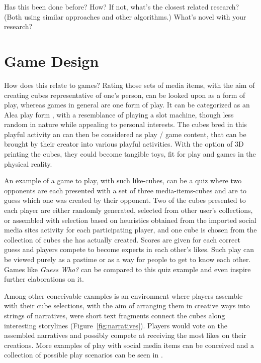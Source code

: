 \documentclass[]{article}
\begin{document}
\begin{framed}
Has this been done before? How? If not, what’s the closest related research? (Both using similar approaches and other algorithms.) What’s novel with your research?
\end{framed}

\section{Game Design}
\label{sec:GameDesign}

How does this relate to games?  Rating those sets of media items, with the aim of creating cubes representative of one's person, can be looked upon as a form of play, whereas games in general are one form of play.  It can be categorized as an Alea play form \cite{caillois2001man}, with a resemblance of playing a slot machine, though less random in nature while appealing to personal interests.  The cubes bred in this playful activity an can then be considered as play / game content, that can be brought by their creator into various playful activities.  With the option of 3D printing the cubes, they could become tangible toys, fit for play and games in the physical reality.

An example of a game to play, with such like-cubes, can be a quiz where two opponents are each presented with a set of three media-items-cubes and are to guess which one was created by their opponent.  Two of the cubes presented to each player are either randomly generated, selected from other user's collections, or assembled with selection based on heuristics obtained from the imported social media sites activity for each participating player, and one cube is chosen from the collection of cubes she has actually created.  Scores are given for each correct guess and players compete to become experts in each other's likes.  Such play can be viewed purely as a pastime or as a way for people to get to know each other.  Games like \textit{Guess Who?}\cite{GuessWho} can be compared to this quiz example and even inspire further elaborations on it.

Among other conceivable examples is an environment where players assemble with their cube selections, with the aim of arranging them in creative ways into strings of narratives, were short text fragments connect the cubes along interesting storylines (Figure~\ref{fig:narratives}).  Players would vote on the assembled narratives and possibly compete at receiving the most likes on their creations.  More examples of play with social media items can be conceived and a collection of possible play scenarios can be seen in \cite{GoLplay}.
\end{document}
